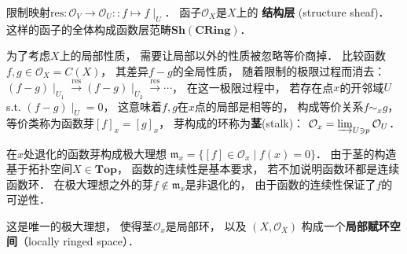 限制映射$\text{res}: \mathcal O_V \to \mathcal O_U :: f \mapsto f\mid_U$．
函子$\mathcal O_X$是$X$上的 \textbf{结构层} (structure sheaf)．
这样的函子的全体构成函数层范畴$\textbf{Sh}(\textbf{CRing})$．

为了考虑$X$上的局部性质，
需要让局部以外的性质被忽略等价商掉．
比较函数$f,g\in\mathcal O_X = C(X)$，
其差异$f-g$的全局性质，
随着限制的极限过程而消去：
$(f-g)\mid_{U_1} \stackrel{\text{res}}{\longrightarrow}(f-g)\mid_{U_2} \stackrel{\text{res}}{\longrightarrow} \cdots $，
在这一极限过程中，
若存在点$x$的开邻域$U$ s.t. $(f-g)\mid_U = 0$，
这意味着$f,g$在$x$点的局部是相等的，
构成等价关系$f \sim_x g$，
等价类称为函数芽$[f]_x = [g]_x$，
芽构成的环称为\textbf{茎}(stalk)：
$\mathcal O_x = \varinjlim_{U \ni p} \mathcal O_U$．

在$x$处退化的函数芽构成极大理想
$\mathfrak m_x = \{ [f] \in \mathcal{O}_x \mid f(x) = 0 \}$．
由于茎的构造基于拓扑空间$X\in\textbf{Top}$，
函数的连续性是基本要求，
若不加说明函数环都是连续函数环．
在极大理想之外的芽$f \notin \mathfrak m_x$是非退化的，
由于函数的连续性保证了$f$的可逆性．

这是唯一的极大理想，
使得茎$\mathcal O_x$是局部环，
以及 $(X, \mathcal O_X)$ 构成一个\textbf{局部赋环空间}（locally ringed space）．


